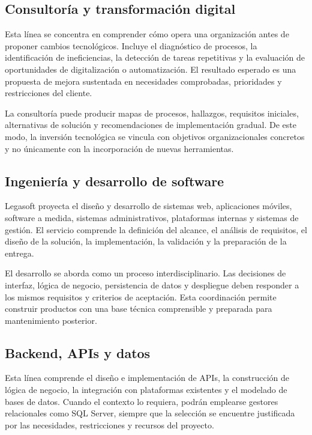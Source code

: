 \subsection{Consultoría y transformación digital}

Esta línea se concentra en comprender cómo opera una organización antes de
proponer cambios tecnológicos. Incluye el diagnóstico de procesos, la
identificación de ineficiencias, la detección de tareas repetitivas y la
evaluación de oportunidades de digitalización o automatización. El resultado
esperado es una propuesta de mejora sustentada en necesidades comprobadas,
prioridades y restricciones del cliente.

La consultoría puede producir mapas de procesos, hallazgos, requisitos iniciales,
alternativas de solución y recomendaciones de implementación gradual. De este
modo, la inversión tecnológica se vincula con objetivos organizacionales
concretos y no únicamente con la incorporación de nuevas herramientas.

\subsection{Ingeniería y desarrollo de software}

Legasoft proyecta el diseño y desarrollo de sistemas web, aplicaciones móviles,
software a medida, sistemas administrativos, plataformas internas y sistemas de
gestión. El servicio comprende la definición del alcance, el análisis de
requisitos, el diseño de la solución, la implementación, la validación y la
preparación de la entrega.

El desarrollo se aborda como un proceso interdisciplinario. Las decisiones de
interfaz, lógica de negocio, persistencia de datos y despliegue deben responder a
los mismos requisitos y criterios de aceptación. Esta coordinación permite
construir productos con una base técnica comprensible y preparada para
mantenimiento posterior.

\subsection{Backend, APIs y datos}

Esta línea comprende el diseño e implementación de APIs, la construcción de
lógica de negocio, la integración con plataformas existentes y el modelado de
bases de datos. Cuando el contexto lo requiera, podrán emplearse gestores
relacionales como SQL Server, siempre que la selección se encuentre justificada
por las necesidades, restricciones y recursos del proyecto.

